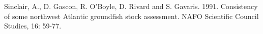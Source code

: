 \documentclass[letter,11pt]{article}
\begin{document}
Sinclair, A., D. Gascon, R. O'Boyle, D. Rivard and S. Gavaris. 1991.
Consistency of some northwest Atlantic groundfish stock assessment.
NAFO Scientific Council Studies, 16: 59-77.



\newpage
\pagestyle{empty}
\end{document}
